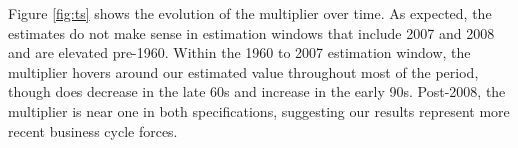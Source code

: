 Figure \ref{fig:ts} shows the evolution of the multiplier over time. As expected, the estimates do not make sense in estimation windows that include 2007 and 2008 and are elevated pre-1960. Within the 1960 to 2007 estimation window, the multiplier hovers around our estimated value throughout most of the period, though does decrease in the late 60s and increase in the early 90s. Post-2008, the multiplier is near one in both specifications, suggesting our results represent more recent business cycle forces. 
